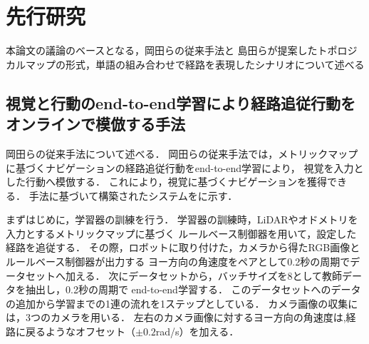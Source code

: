 \chapter{先行研究}
本論文の議論のベースとなる，岡田らの従来手法と
島田らが提案したトポロジカルマップの形式，単語の組み合わせで経路を表現したシナリオについて述べる

\section{視覚と行動のend-to-end学習により経路追従行動を
オンラインで模倣する手法}
岡田らの従来手法について述べる．
岡田らの従来手法では，メトリックマップに基づくナビゲーションの経路追従行動をend-to-end学習により，
視覚を入力とした行動へ模倣する．
これにより，視覚に基づくナビゲーションを獲得できる．
手法に基づいて構築されたシステムをに示す．

まずはじめに，学習器の訓練を行う．
学習器の訓練時，LiDARやオドメトリを入力とするメトリックマップに基づく
ルールベース制御器を用いて，設定した経路を追従する．
その際，ロボットに取り付けた，カメラから得たRGB画像とルールベース制御器が出力する
ヨー方向の角速度をペアとして0.2秒の周期でデータセットへ加える．
次にデータセットから，バッチサイズを8として教師データを抽出し，0.2秒の周期で
end-to-end学習する．
このデータセットへのデータの追加から学習までの1連の流れを1ステップとしている．
カメラ画像の収集には，3つのカメラを用いる．
左右のカメラ画像に対するヨー方向の角速度は,経路に戻るようなオフセット（\(\pm 0.2\)rad/s）を加える．

